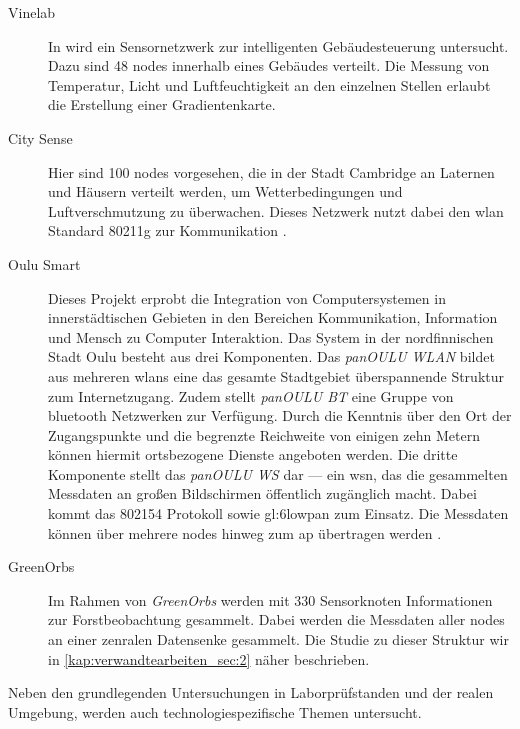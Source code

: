 \begin{description}

\item[Vinelab] In \cite{VineLab} wird ein Sensornetzwerk zur intelligenten Gebäudesteuerung untersucht. Dazu sind 48 \glspl{node} innerhalb eines Gebäudes verteilt.  Die Messung von Temperatur, Licht und Luftfeuchtigkeit an den einzelnen Stellen erlaubt die Erstellung einer Gradientenkarte.

\item[City Sense] Hier sind 100 \glspl{node} vorgesehen, die in der Stadt Cambridge an Laternen und Häusern verteilt werden, um Wetterbedingungen und Luftverschmutzung zu überwachen. Dieses Netzwerk nutzt dabei den \gls{wlan} Standard \gls{80211g} zur Kommunikation \cite{CitySense}.

\item[Oulu Smart] Dieses Projekt erprobt die Integration von Computersystemen in innerstädtischen Gebieten in den Bereichen Kommunikation, Information und Mensch zu Computer Interaktion. Das System in der nordfinnischen Stadt Oulu besteht aus drei Komponenten. Das \emph{panOULU WLAN} bildet aus mehreren \glspl{wlan} eine das gesamte Stadtgebiet überspannende Struktur zum Internetzugang. Zudem stellt \emph{panOULU BT} eine Gruppe von \gls{bluetooth} Netzwerken zur Verfügung. Durch die Kenntnis über den Ort der Zugangspunkte und die begrenzte Reichweite von einigen zehn Metern  können hiermit ortsbezogene Dienste angeboten werden. Die dritte Komponente stellt das \emph{panOULU WS} dar --- ein \acs{wsn}, das die gesammelten Messdaten an großen Bildschirmen öffentlich zugänglich macht. Dabei kommt das \gls{802154} Protokoll sowie \gls{gl:6lowpan} zum Einsatz. Die Messdaten können über mehrere \glspl{node} hinweg zum \acs{ap} übertragen werden \cite{OuluSmart}.

\item[GreenOrbs] Im Rahmen von \emph{GreenOrbs} werden mit 330 Sensorknoten Informationen zur Forstbeobachtung gesammelt. Dabei werden die Messdaten aller \glspl{node} an einer zenralen Datensenke gesammelt. Die Studie \cite{GreenOrbs} zu dieser Struktur wir in \autoref{kap:verwandtearbeiten_sec:2} näher beschrieben.

\end{description} 
Neben den grundlegenden Untersuchungen in Laborprüfstanden und der realen Umgebung, werden auch technologiespezifische Themen untersucht.
